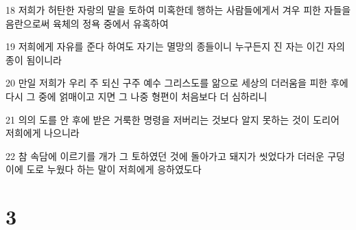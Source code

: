 \par 18 저희가 허탄한 자랑의 말을 토하여 미혹한데 행하는 사람들에게서 겨우 피한 자들을 음란으로써 육체의 정욕 중에서 유혹하여
\par 19 저희에게 자유를 준다 하여도 자기는 멸망의 종들이니 누구든지 진 자는 이긴 자의 종이 됨이니라
\par 20 만일 저희가 우리 주 되신 구주 예수 그리스도를 앎으로 세상의 더러움을 피한 후에 다시 그 중에 얽매이고 지면 그 나중 형편이 처음보다 더 심하리니
\par 21 의의 도를 안 후에 받은 거룩한 명령을 저버리는 것보다 알지 못하는 것이 도리어 저희에게 나으니라
\par 22 참 속담에 이르기를 개가 그 토하였던 것에 돌아가고 돼지가 씻었다가 더러운 구덩이에 도로 누웠다 하는 말이 저희에게 응하였도다

\chapter{3}

